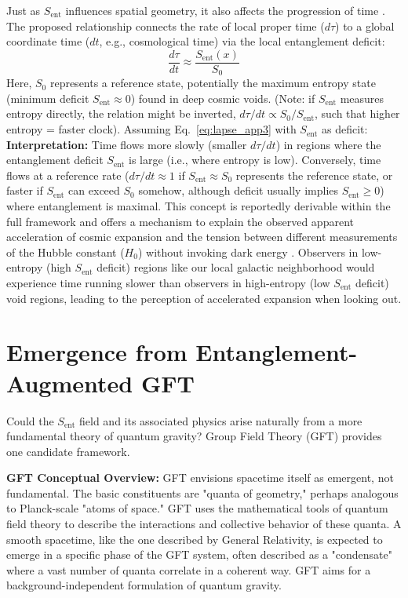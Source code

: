 \documentclass[11pt]{article}
\begin{document}
Just as $S_{\mathrm{ent}}$ influences spatial geometry, it also affects the progression of time \cite{Chinitz2025}. The proposed relationship connects the rate of local proper time ($d\tau$) to a global coordinate time ($dt$, e.g., cosmological time) via the local entanglement deficit:
\begin{equation}
\frac{d\tau}{dt} \approx \frac{S_{\mathrm{ent}}(x)}{S_0} \label{eq:lapse_app3}
\end{equation}
Here, $S_0$ represents a reference state, potentially the maximum entropy state (minimum deficit $S_{\mathrm{ent}} \approx 0$) found in deep cosmic voids. (Note: if $S_{\mathrm{ent}}$ measures entropy directly, the relation might be inverted, $d\tau/dt \propto S_0/S_{\mathrm{ent}}$, such that higher entropy = faster clock). Assuming Eq.~\eqref{eq:lapse_app3} with $S_{\mathrm{ent}}$ as deficit:
\textbf{Interpretation:} Time flows more slowly (smaller $d\tau/dt$) in regions where the entanglement deficit $S_{\mathrm{ent}}$ is large (i.e., where entropy is low). Conversely, time flows at a reference rate ($d\tau/dt \approx 1$ if $S_{\mathrm{ent}} \approx S_0$ represents the reference state, or faster if $S_{\mathrm{ent}}$ can exceed $S_0$ somehow, although deficit usually implies $S_{\mathrm{ent}} \ge 0$) where entanglement is maximal. This concept is reportedly derivable within the full framework \cite[Appendix A.1.1, A.2.3]{Chinitz2025} and offers a mechanism to explain the observed apparent acceleration of cosmic expansion and the tension between different measurements of the Hubble constant ($H_0$) without invoking dark energy \cite{Chinitz2025}. Observers in low-entropy (high $S_{\mathrm{ent}}$ deficit) regions like our local galactic neighborhood would experience time running slower than observers in high-entropy (low $S_{\mathrm{ent}}$ deficit) void regions, leading to the perception of accelerated expansion when looking out.

\section{Emergence from Entanglement-Augmented GFT}

Could the $S_{\mathrm{ent}}$ field and its associated physics arise naturally from a more fundamental theory of quantum gravity? Group Field Theory (GFT) provides one candidate framework.

\textbf{GFT Conceptual Overview:} GFT \cite{Liu2023} envisions spacetime itself as emergent, not fundamental. The basic constituents are "quanta of geometry," perhaps analogous to Planck-scale "atoms of space." GFT uses the mathematical tools of quantum field theory to describe the interactions and collective behavior of these quanta. A smooth spacetime, like the one described by General Relativity, is expected to emerge in a specific phase of the GFT system, often described as a "condensate" where a vast number of quanta correlate in a coherent way. GFT aims for a background-independent formulation of quantum gravity.
\end{document}
